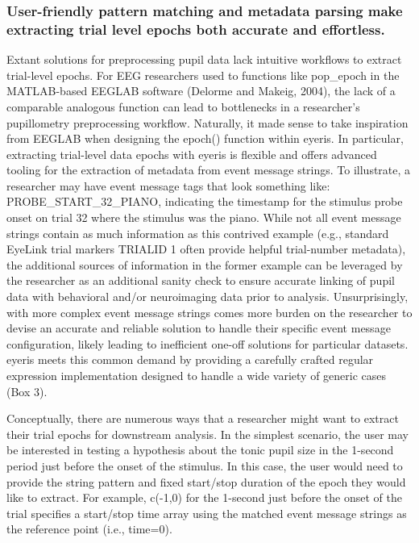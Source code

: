 \subsubsection{User-friendly pattern matching and metadata parsing make extracting trial level epochs both accurate and effortless.}
Extant solutions for preprocessing pupil data lack intuitive workflows to extract trial-level epochs. For EEG researchers used to functions like pop\_epoch in the MATLAB-based EEGLAB software (Delorme and Makeig, 2004), the lack of a comparable analogous function can lead to bottlenecks in a researcher’s pupillometry preprocessing workflow. Naturally, it made sense to take inspiration from EEGLAB when designing the epoch() function within eyeris. In particular, extracting trial-level data epochs with eyeris is flexible and offers advanced tooling for the extraction of metadata from event message strings. To illustrate, a researcher may have event message tags that look something like: PROBE\_START\_32\_PIANO, indicating the timestamp for the stimulus probe onset on trial 32 where the stimulus was the piano. While not all event message strings contain as much information as this contrived example (e.g., standard EyeLink trial markers TRIALID 1 often provide helpful trial-number metadata), the additional sources of information in the former example can be leveraged by the researcher as an additional sanity check to ensure accurate linking of pupil data with behavioral and/or neuroimaging data prior to analysis. Unsurprisingly, with more complex event message strings comes more burden on the researcher to devise an accurate and reliable solution to handle their specific event message configuration, likely leading to inefficient one-off solutions for particular datasets. eyeris meets this common demand by providing a carefully crafted regular expression implementation designed to handle a wide variety of generic cases (Box 3).

Conceptually, there are numerous ways that a researcher might want to extract their trial epochs for downstream analysis. In the simplest scenario, the user may be interested in testing a hypothesis about the tonic pupil size in the 1-second period just before the onset of the stimulus. In this case, the user would need to provide the string pattern and fixed start/stop duration of the epoch they would like to extract. For example, c(-1,0) for the 1-second just before the onset of the trial specifies a start/stop time array using the matched event message strings as the reference point (i.e., time=0).

